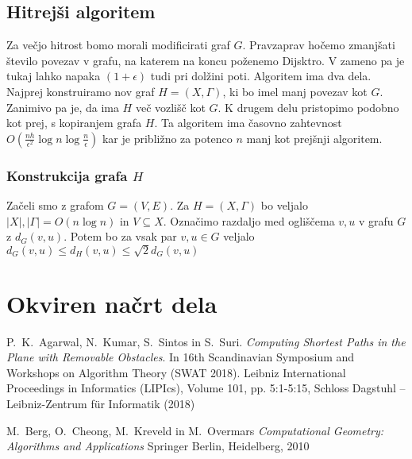 \documentclass{article}
\begin{document}
\subsection*{Hitrejši algoritem}

Za večjo hitrost bomo morali modificirati graf $G$. Pravzaprav hočemo zmanjšati število povezav v grafu, na katerem na koncu poženemo Dijsktro. V zameno pa je tukaj lahko napaka $(1+\epsilon)$ tudi pri dolžini poti. Algoritem ima dva dela. Najprej konstruiramo nov graf $H = (X,\Gamma)$, ki bo imel manj povezav kot $G$. Zanimivo pa je, da ima $H$ več vozlišč kot $G$. K drugem delu pristopimo podobno kot prej, s kopiranjem grafa $H$. Ta algoritem ima časovno zahtevnost $O(\frac{nh}{\epsilon^2}\log n \log \frac{n}{\epsilon})$ kar je približno za potenco $n$ manj kot prejšnji algoritem.

\subsubsection*{Konstrukcija grafa $H$}

Začeli smo z grafom $G = (V,E)$. Za $H = (X,\Gamma)$ bo veljalo $|X|, |\Gamma| = O(n \log n)$ in $V \subseteq X$. Označimo razdaljo med ogliščema $v,u$ v grafu $G$ z $d_G(v,u)$. Potem bo za vsak par $v,u \in G$ veljalo  $d_G(v,u) \leq d_H(v,u) \leq \sqrt{2}d_G(v,u)$

\section*{Okviren načrt dela}



\begin{thebibliography}{99}

     P.~K.~Agarwal, N.~Kumar, S.~Sintos in S.~Suri. \emph{Computing Shortest Paths in the Plane with Removable Obstacles}. In 16th Scandinavian Symposium and Workshops on Algorithm Theory (SWAT 2018). Leibniz International Proceedings in Informatics (LIPIcs), Volume 101, pp. 5:1-5:15, Schloss Dagstuhl – Leibniz-Zentrum für Informatik (2018)

     M.~Berg, O.~Cheong, M.~Kreveld in  M.~Overmars \emph{Computational Geometry: Algorithms and Applications} Springer Berlin, Heidelberg, 2010

\end{thebibliography}
\end{document}
